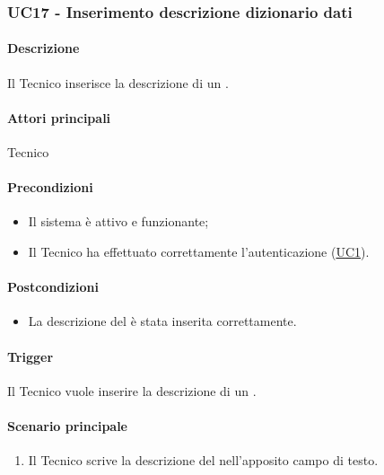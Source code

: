 \subsubsection{UC17 - Inserimento descrizione dizionario dati}\label{UC17}
\paragraph*{Descrizione}
Il Tecnico inserisce la descrizione di un .

\paragraph*{Attori principali}
Tecnico

\paragraph*{Precondizioni}
\begin{itemize}
  \item Il sistema è attivo e funzionante;
  \item Il Tecnico ha effettuato correttamente l'autenticazione (\hyperref[UC1]{UC1}).
\end{itemize}

\paragraph*{Postcondizioni}
\begin{itemize}
  \item La descrizione del  è stata inserita correttamente.
\end{itemize}

\paragraph*{Trigger}
Il Tecnico vuole inserire la descrizione di un .

\paragraph*{Scenario principale}
\begin{enumerate}
  \item Il Tecnico scrive la descrizione del  nell'apposito campo di testo.
\end{enumerate}